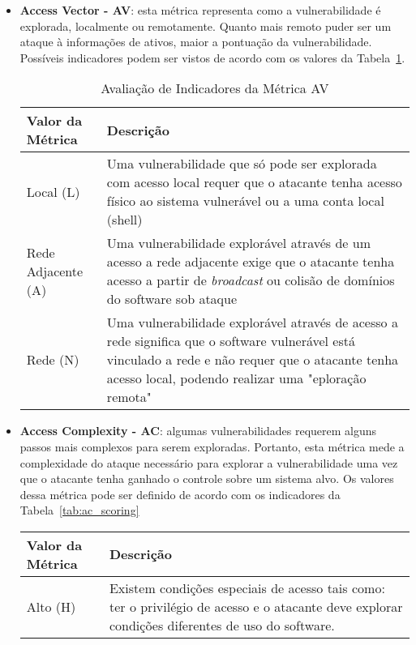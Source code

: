 \begin{itemize}
\item \textbf{Access Vector - AV}: esta métrica representa como a vulnerabilidade é explorada, localmente ou remotamente. Quanto mais remoto puder ser um ataque à informações de ativos, maior a pontuação da vulnerabilidade. Possíveis indicadores podem ser vistos  de acordo com os valores da Tabela~\ref{tab:av_scoring}.
	\begin{table}[H]
	\begin{center}
	    \begin{tabular}{ | l | l |}
	    \hline
	    Valor da Métrica & Descrição \\ \hline
	    Local (L) & Uma vulnerabilidade que só pode ser explorada com acesso local requer que o atacante tenha acesso físico ao sistema vulnerável ou a uma conta local (shell) \\ \hline
	    Rede Adjacente (A) & Uma vulnerabilidade explorável através de um acesso a rede adjacente exige que o atacante tenha acesso a partir de \emph{broadcast} ou colisão de domínios do software sob ataque \\ \hline
	    Rede (N) & Uma vulnerabilidade explorável através de acesso a rede significa que o software vulnerável está vinculado a rede e não requer que o atacante tenha acesso local, podendo realizar uma "eploração remota" \\ \hline
	    \end{tabular}
	    \caption{Avaliação de Indicadores da Métrica AV}
	    \label{tab:av_scoring}
	\end{center}
	\end{table}
\item \textbf{Access Complexity - AC}: algumas vulnerabilidades requerem alguns passos mais complexos para serem exploradas. Portanto, esta métrica mede a complexidade do ataque necessário para explorar a vulnerabilidade uma vez que o atacante tenha ganhado o controle sobre um sistema alvo. Os valores dessa métrica pode ser definido de acordo com os indicadores da Tabela~\ref{tab:ac_scoring}
	\begin{table}[H]
	\begin{center}
	    \begin{tabular}{ | l | l |}
	    \hline
	    Valor da Métrica & Descrição \\ \hline
	    Alto (H) & Existem condições especiais de acesso tais como: ter o privilégio de acesso e o atacante deve explorar condições diferentes de uso do software. \\ \hline

\end{tabular}
\end{center}
\end{table}
\end{itemize}
